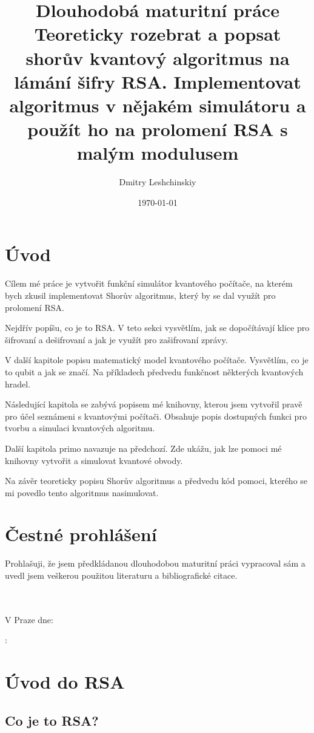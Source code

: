 \documentclass[11pt]{article}
\title{Dlouhodobá maturitní práce \\
\large Teoreticky rozebrat a popsat shorův kvantový algoritmus na lámání šifry RSA. 
Implementovat algoritmus v nějakém simulátoru a použít ho na prolomení RSA s malým modulusem}
\author{Dmitry Leshchinskiy}
\date{\today}
\makeatletter
\let\myauthor\@author
\let\mydate\@date
\makeatother
\begin{document}
\maketitle
\newpage

\tableofcontents
\newpage

\section{Úvod}
Cílem mé práce je vytvořit funkční simulátor kvantového počítače, na kterém bych zkusil implementovat Shorův algoritmus, který by se dal využít pro prolomení RSA.
\par Nejdřív popíšu, co je to RSA.
V teto sekci vysvětlím, jak se dopočítávají klice pro šifrovaní a dešifrovaní a jak je využít pro zašifrovaní zprávy.
\par V další kapitole popisu matematický model kvantového počítače.
Vysvětlím, co je to qubit a jak se značí.
Na příkladech předvedu funkčnost některých kvantových hradel.
\par Následující kapitola se zabývá popisem mé knihovny, kterou jsem vytvořil pravě pro účel seznámeni s kvantovými počítači.
Obsahuje popis dostupných funkci pro tvorbu a simulaci kvantových algoritmu.
\par Další kapitola primo navazuje na předchozí.
Zde ukážu, jak lze pomoci mé knihovny vytvořit a simulovat kvantové obvody.
\par Na závěr teoreticky popisu Shorův algoritmus a předvedu kód pomoci, kterého se mi povedlo tento algoritmus nasimulovat.
\newpage

\section{Čestné prohlášení}
Prohlašuji, že jsem předkládanou dlouhodobou maturitní práci vypracoval
sám a uvedl jsem veškerou použitou literaturu a bibliografické citace.
\\ \\ \\
\par V Praze dne: \mydate \\
\par \myauthor: \hrulefill
\newpage

\section{Úvod do RSA}
\subsection{Co je to RSA?}
\end{document}
